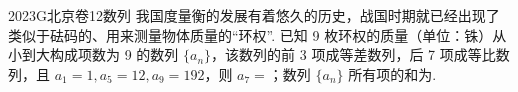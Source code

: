 
\begin{problem}{2023}{G}{北京卷}{12}{数列}
我国度量衡的发展有着悠久的历史，战国时期就已经出现了类似于砝码的、用来测量物体质量的“环权”. 已知 9 枚环权的质量（单位：铢）从小到大构成项数为 9 的数列 $\{a_n\}$，该数列的前 3 项成等差数列，后 7 项成等比数列，且 $a_1=1, a_5=12, a_9=192$，则 $a_7=$\underline{\hspace{4em}}；数列 $\{a_n\}$ 所有项的和为\underline{\hspace{4em}}.
\end{problem}